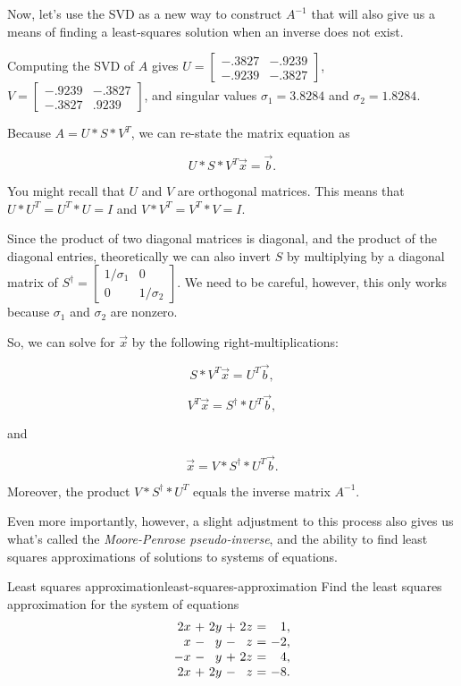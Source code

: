 \documentclass{ximera}
\begin{document}
Now, let's use the SVD as a new way to construct $A^{-1}$ that will also give us a means of finding a least-squares solution when an inverse does not exist. 

Computing the SVD of $A$ gives $U=\begin{bmatrix}
  -.3827 & -.9239\\-.9239& -.3827
\end{bmatrix}$, $V=\begin{bmatrix}
  -.9239 & -.3827\\
  -.3827 & .9239
\end{bmatrix}$, and singular values $\sigma_1=3.8284$ and $\sigma_2=1.8284$.

Because $A=U*S*V^T$, we can re-state the matrix equation as 

$$U*S*V^T\vec{x}=\vec{b}.$$

You might recall that $U$ and $V$ are orthogonal matrices. This means that $U*U^T=U^T*U=I$ and $V*V^T=V^T*V=I$. 

Since the product of two diagonal matrices is diagonal, and the product of the diagonal entries, theoretically we can also invert $S$ by multiplying by a diagonal matrix of $S^\dagger=\begin{bmatrix}
  1/\sigma_1 & 0\\0 & 1/\sigma_2
\end{bmatrix}$. We need to be careful, however, this only works because $\sigma_1$ and $\sigma_2$ are nonzero. 

So, we can solve for $\vec{x}$ by the following right-multiplications:

$$S*V^T\vec{x}=U^T\vec{b},$$

$$V^T\vec{x}=S^\dagger*U^T\vec{b},$$

and

$$\vec{x}=V*S^\dagger*U^T\vec{b}.$$

Moreover, the product $V*S^\dagger*U^T$ equals the inverse matrix $A^{-1}$. 

Even more importantly, however, a slight adjustment to this process also gives us what's called the \emph{Moore-Penrose pseudo-inverse}, and the ability to find least squares approximations of solutions to systems of equations. 



\begin{example}{Least squares approximation}{least-squares-approximation}
  Find the least squares approximation for the system of equations
  \begin{equation*}
    \begin{array}{r@{~}c@{~}r@{~}c@{~}r@{~}c@{~}r}
      2x &+& 2y &+& 2z &=&  1, \\
      x  &-&  y &-&  z &=& -2, \\
      -x &-&  y &+& 2z &=&  4, \\
      2x &+& 2y &-&  z &=& -8. \\
    \end{array}
  \end{equation*}
\end{example}
\end{document}
